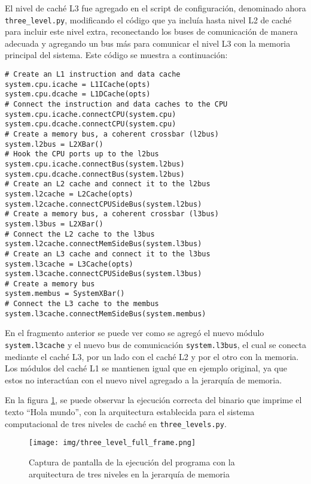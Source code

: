 \documentclass {article}
\begin{document}
El nivel de caché L3 fue agregado en el script de configuración, denominado ahora
\texttt{three\_level.py}, modificando el código que ya incluía hasta nivel L2 de caché para incluir
este nivel extra, reconectando los buses de comunicación de manera adecuada y agregando un bus más
para comunicar el nivel L3 con la memoria principal del sistema. Este código se muestra a
continuación:

\begin{lstlisting}
# Create an L1 instruction and data cache
system.cpu.icache = L1ICache(opts)
system.cpu.dcache = L1DCache(opts)
# Connect the instruction and data caches to the CPU
system.cpu.icache.connectCPU(system.cpu)
system.cpu.dcache.connectCPU(system.cpu)
# Create a memory bus, a coherent crossbar (l2bus)
system.l2bus = L2XBar()
# Hook the CPU ports up to the l2bus
system.cpu.icache.connectBus(system.l2bus)
system.cpu.dcache.connectBus(system.l2bus)
# Create an L2 cache and connect it to the l2bus
system.l2cache = L2Cache(opts)
system.l2cache.connectCPUSideBus(system.l2bus)
# Create a memory bus, a coherent crossbar (l3bus)
system.l3bus = L2XBar()
# Connect the L2 cache to the l3bus
system.l2cache.connectMemSideBus(system.l3bus)
# Create an L3 cache and connect it to the l3bus
system.l3cache = L3Cache(opts)
system.l3cache.connectCPUSideBus(system.l3bus)
# Create a memory bus
system.membus = SystemXBar()
# Connect the L3 cache to the membus
system.l3cache.connectMemSideBus(system.membus)
\end{lstlisting}

En el fragmento anterior se puede ver como se agregó el nuevo módulo \texttt{system.l3cache} y el
nuevo bus de comunicación \texttt{system.l3bus}, el cual se conecta mediante el caché L3, por un
lado con el caché L2 y por el otro con la memoria. Los módulos del caché L1 se mantienen igual que
en ejemplo original, ya que estos no interactúan con el nuevo nivel agregado a la jerarquía de
memoria.

En la figura \ref{fig:three_levels}, se puede observar la ejecución correcta del binario que imprime
el texto ``Hola mundo'', con la arquitectura establecida para el sistema computacional de tres
niveles de caché en \texttt{three\_levels.py}.

\begin{figure}[H]
  \centering
  \texttt{[image: img/three\_level\_full\_frame.png]}
  \caption{\label{fig:three_levels} Captura de pantalla de la ejecución del programa con la
    arquitectura de tres niveles en la jerarquía de memoria}
\end{figure}
\end{document}
